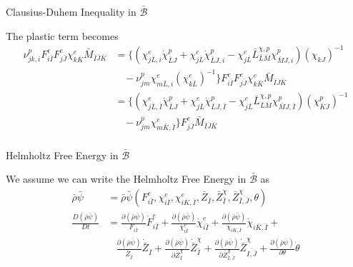 \documentclass[11pt]{beamer}
\begin{document}
\begin{frame}{Clausius-Duhem Inequality in $\bar{\mathcal{B}}$}

The plastic term becomes
\begin{align*}
\nu_{jk,i}^p  F_{i\bar{I}}^e F_{j\bar{J}}^e \chi_{k\bar{K}}^e \bar{M}_{\bar{I}\bar{J}\bar{K}} &= \bigg\{\left(\chi_{j\bar{L},i}^e \dot{\chi}_{\bar{L}J}^p + \chi_{j\bar{L}}^e\dot{\chi}_{\bar{L}J,i}^p - \chi_{j\bar{L}}^e\bar{L}_{\bar{L}\bar{M}}^{\chi,p}\chi_{\bar{M}J,i}^p\right)\left(\chi_{kJ}\right)^{-1}\\
&\ \ \ \ -\nu_{jm}^p \chi_{m\bar{L},i}^e\left(\chi_{k\bar{L}}^e\right)^{-1}\bigg\}  F_{i\bar{I}}^e F_{j\bar{J}}^e \chi_{k\bar{K}}^e \bar{M}_{\bar{I}\bar{J}\bar{K}}\\
&= \bigg\{\left(\chi_{j\bar{L},\bar{I}}^e \dot{\chi}_{\bar{L}J}^p + \chi_{j\bar{L}}^e\dot{\chi}_{\bar{L}J,\bar{I}}^p - \chi_{j\bar{L}}^e\bar{L}_{\bar{L}\bar{M}}^{\chi,p}\chi_{\bar{M}J,\bar{I}}^p\right)\left(\chi_{\bar{K} J}^p\right)^{-1}\\
&\ \ \ \ -\nu_{jm}^p \chi_{m\bar{K},\bar{I}}^e\bigg\} F_{j\bar{J}}^e \bar{M}_{\bar{I}\bar{J}\bar{K}}\\
\end{align*}

\end{frame}

\begin{frame}{Helmholtz Free Energy in $\bar{\mathcal{B}}$}

We assume we can write the Helmholtz Free Energy in $\bar{\mathcal{B}}$ as
\begin{align*}
\bar{\rho}\bar{\psi} &= \bar{\rho}\bar{\psi}\left(F_{i\bar{I}}^e,\chi_{i\bar{I}}^e,\chi_{i\bar{K},\bar{I}}^e,\bar{Z}_{\bar{I}},\bar{Z}_{\bar{I}}^{\chi},\bar{Z}_{\bar{I},\bar{J}}^{\chi},\theta\right)\\
\frac{D\left(\bar{\rho}\bar{\psi}\right)}{Dt} &= \frac{\partial \left(\bar{\rho}\bar{\psi}\right)}{F_{i\bar{I}}} \dot{F}_{i\bar{I}}^e + \frac{\partial\left(\bar{\rho}\bar{\psi}\right)}{\chi_{i\bar{I}}^e} \dot{\chi}_{i\bar{I}}^e + \frac{\partial \left(\bar{\rho}\bar{\psi}\right)}{\chi_{i\bar{K},\bar{I}}} \dot{\chi}_{i\bar{K},\bar{I}} +\\
&\ \ \ \ \frac{\partial \left(\bar{\rho}\bar{\psi}\right)}{\bar{Z}_{\bar{I}}} \dot{\bar{Z}}_{\bar{I}} + \frac{\partial \left(\bar{\rho}\bar{\psi}\right)}{\partial \bar{Z}_{\bar{I}}^{\chi}} \dot{\bar{Z}}_{\bar{I}}^{\chi} + \frac{\partial \left(\bar{\rho}\bar{\psi}\right)}{\partial \bar{Z}_{\bar{I},\bar{J}}^{\chi}} \dot{\bar{Z}}_{\bar{I,\bar{J}}}^{\chi} + \frac{\partial \left(\bar{\rho}\bar{\psi}\right)}{\partial \theta} \dot{\theta}\\
\end{align*}

\end{frame}
\end{document}
